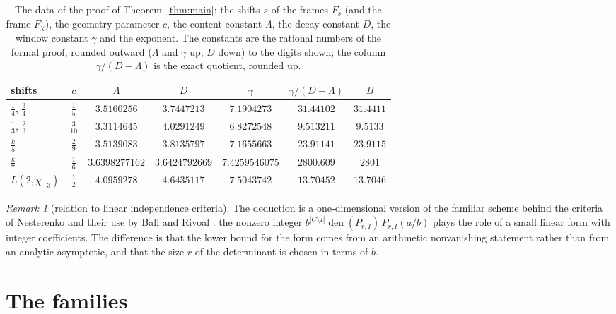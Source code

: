 \documentclass[11pt]{amsart}
\theoremstyle{definition}
\theoremstyle{remark}
\newtheorem{remark}[theorem]{Remark}
\numberwithin{equation}{section}
\newcommand{\den}{\operatorname{den}}
\newcommand{\MuLamU}{31.4411}
\newcommand{\MuThirdsU}{9.5133}
\newcommand{\MuFifthsU}{23.9115}
\newcommand{\MuSeventhsU}{2801}
\newcommand{\MuChi}{13.7046}
\newcommand{\LamFour}{3.5160256}  \newcommand{\DFour}{3.7447213}  \newcommand{\gFour}{7.1904273}  \newcommand{\ExpFour}{31.44102}
\newcommand{\LamThree}{3.3114645} \newcommand{\DThree}{4.0291249} \newcommand{\gThree}{6.8272548} \newcommand{\ExpThree}{9.513211}
\newcommand{\LamFive}{3.5139083}  \newcommand{\DFive}{3.8135797}  \newcommand{\gFive}{7.1655663}  \newcommand{\ExpFive}{23.91141}
\newcommand{\LamSeven}{3.6398277162} \newcommand{\DSeven}{3.6424792669} \newcommand{\gSeven}{7.4259546075} \newcommand{\ExpSeven}{2800.609}
\newcommand{\LamChi}{4.0959278}   \newcommand{\DChi}{4.6435117}   \newcommand{\gChi}{7.5043742}  \newcommand{\ExpChi}{13.70452}
\begin{document}
\begin{table}[ht]
\centering
{\setlength{\tabcolsep}{1.8pt}
\begin{tabular}{@{}lcccccc@{}}
\toprule
shifts & $c$ & $\Lambda$ & $D$ & $\gamma$ & $\gamma/(D-\Lambda)$ & $B$\\
\midrule
$\frac14$, $\frac34$ & $\frac15$ & $\LamFour$ & $\DFour$ & $\gFour$ & $\ExpFour$ & $\MuLamU$\\
$\frac13$, $\frac23$ & $\frac3{10}$ & $\LamThree$ & $\DThree$ & $\gThree$ & $\ExpThree$ & $\MuThirdsU$\\
$\frac k5$ & $\frac29$ & $\LamFive$ & $\DFive$ & $\gFive$ & $\ExpFive$ & $\MuFifthsU$\\
$\frac k7$ & $\frac16$ & $\LamSeven$ & $\DSeven$ & $\gSeven$ & $\ExpSeven$ & $\MuSeventhsU$\\
$L(2,\chi_{-3})$ & $\frac12$ & $\LamChi$ & $\DChi$ & $\gChi$ & $\ExpChi$ & $\MuChi$\\
\bottomrule
\end{tabular}}
\caption{The data of the proof of Theorem~\ref{thm:main}: the shifts $s$ of the frames $F_s$ (and the frame $F_\chi$), the geometry parameter $c$, the
content constant $\Lambda$, the decay constant $D$, the window constant $\gamma$ and the exponent. The constants are the rational
numbers of the formal proof, rounded outward ($\Lambda$ and $\gamma$ up, $D$ down) to the digits shown; the column $\gamma/(D-\Lambda)$
is the exact quotient, rounded up.}\label{tab:data}
\end{table}

\begin{remark}[relation to linear independence criteria]
The deduction is a one-dimensional version of the familiar scheme behind the criteria of Nesterenko
\cite{Nesterenko85} and their use by Ball and Rivoal \cite{BallRivoal01}: the nonzero integer
$b^{|C\setminus I|}\den(P_{r,I})\,P_{r,I}(a/b)$ plays the role of a small linear form with integer coefficients. The difference is that
the lower bound for the form comes from an arithmetic nonvanishing statement rather than from an analytic asymptotic,
and that the size $r$ of the determinant is chosen in terms of $b$.
\end{remark}

\section{The families}\label{sec:families}
\end{document}
